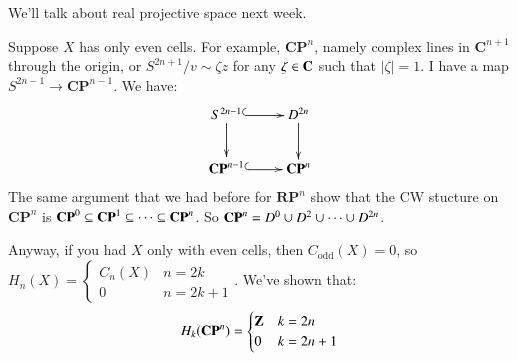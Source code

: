 We'll talk about real projective space next week.
\begin{remark}
Suppose $X$ has only even cells. For example, $\mathbf{CP}^n$, namely complex lines in $\mathbf{C}^{n+1}$ through the origin, or $S^{2n+1}/v\sim \zeta z$ for any $\zeta\in \mathbf C$ such that $|\zeta|=1$. I have a map $S^{2n-1}\to \mathbf{CP}^{n-1}$. We have:
\begin{equation*}
\xymatrix{S^{2n-1}\ar@{^(->}[r]\ar[d] & D^{2n}\ar[d]\\
\mathbf{CP}^{n-1}\ar@{^(->}[r] & \mathbf{CP}^n}
\end{equation*}
The same argument that we had before for $\mathbf{RP}^n$ show that the CW stucture on $\mathbf{CP}^n$ is $\mathbf{CP}^0\subseteq\mathbf{CP}^1\subseteq\cdots\subseteq\mathbf{CP}^n$. So $\mathbf{CP}^n=D^0\cup D^2\cup\cdots\cup D^{2n}$.

Anyway, if you had $X$ only with even cells, then $C_{\text{odd}}(X)=0$, so $ H_n(X)=\begin{cases}C_n(X) & n=2k \\ 0 & n=2k+1\end{cases}$. We've shown that:
\begin{equation*}
 H_k(\mathbf{CP}^n)=\begin{cases}
\mathbf Z & k=2n\\
0 & k=2n+1
\end{cases}
\end{equation*}
\end{remark}
